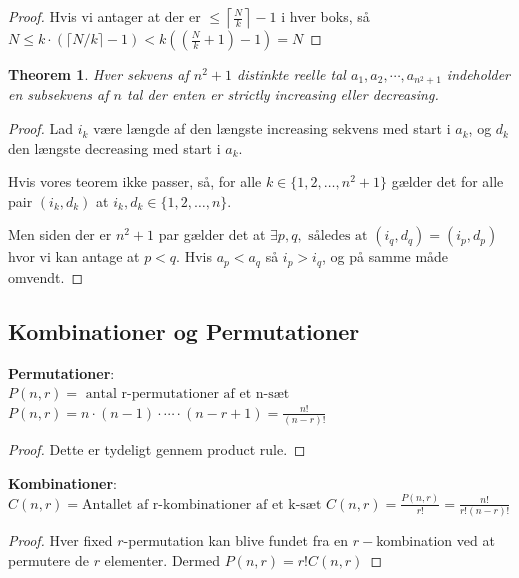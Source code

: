 \documentclass[11pt]{article}
\newtheorem{theorem}{Theorem}
\theoremstyle{definition}
\theoremstyle{remark}
\begin{document}
\begin{proof}
  Hvis vi antager at der er $\leq \left \lceil \frac{N}{k} \right \rceil - 1$ i hver boks, så $N \leq k \cdot (\lceil N/k \rceil - 1) < k ((\frac{N}{k}+1)-1)=N$
\end{proof}

\begin{theorem}
Hver sekvens af $n^{2}+1$ distinkte reelle tal $a_{1}, a_{2}, \cdots, a_{n^{2}+1}$ indeholder en subsekvens af $n$ tal der enten er strictly increasing eller decreasing.
\end{theorem}

\begin{proof}
  Lad $i_{k}$ være længde af den længste increasing sekvens med start i $a_{k}$, og $d_{k}$ den længste decreasing med start i $a_{k}$.

  Hvis vores teorem ikke passer, så, for alle $k \in \{1, 2, \ldots, n^{2}+1\}$ gælder det for alle pair $(i_{k}, d_{k})$ at $i_{k}, d_{k} \in \{1, 2, \ldots, n\}$.

  Men siden der er $n^{2 }+1$ par gælder det at $\exists p,q, \text{ således at } (i_{q}, d_{q}) = (i_{p}, d_{p})$ hvor vi kan antage at $p < q$. Hvis $a_{p} < a_{q}$ så $i_{p} > i_{q}$, og på samme måde omvendt. 
\end{proof}

\subsection{Kombinationer og Permutationer}

\textbf{Permutationer}: \\
$P(n,r) = \text{ antal r-permutationer af et n-sæt}$\\
$P(n,r) = n \cdot (n-1) \cdot \cdots \cdot (n-r+1) = \frac{n!}{(n-r)!}$

\begin{proof}
Dette er tydeligt gennem product rule.
  \end{proof}

\textbf{Kombinationer}: \\

$C(n,r) = \text{Antallet af r-kombinationer af et k-sæt}$
$C(n,r) = \frac{P(n,r)}{r!} = \frac{n!}{r!(n-r)!}$

\begin{proof}
  Hver fixed $r$-permutation kan blive fundet fra en $r-$kombination ved at permutere de $r$ elementer. Dermed $P(n,r) = r! C(n,r)$
  \end{proof}
\end{document}
